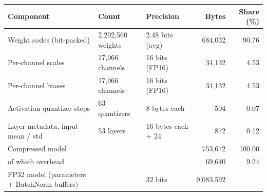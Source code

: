 \begin{tabular}{lllrr}
\toprule
Component & Count & Precision & Bytes & Share (\%) \\
\midrule
Weight codes (bit-packed) & 2,202,560 weights & 2.48 bits (avg) & 684,032 & 90.76 \\
Per-channel scales & 17,066 channels & 16 bits (FP16) & 34,132 & 4.53 \\
Per-channel biases & 17,066 channels & 16 bits (FP16) & 34,132 & 4.53 \\
Activation quantizer steps & 63 quantizers & 8 bytes each & 504 & 0.07 \\
Layer metadata, input mean / std & 53 layers & 16 bytes each + 24 & 872 & 0.12 \\
\midrule
Compressed model & & & 753,672 & 100.00 \\
of which overhead & & & 69,640 & 9.24 \\
FP32 model (parameters + BatchNorm buffers) & & 32 bits & 9,083,592 & \\
\bottomrule
\end{tabular}
